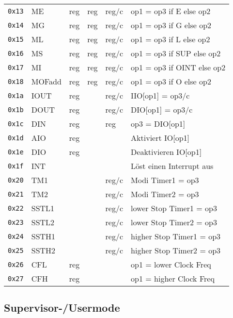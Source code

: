 \documentclass{scrartcl}
\begin{document}
\begin{center}
\begin{table*}
\begin{tabular}{l | l l l l | l}
			\texttt{0x13} & ME     & reg & reg & reg/c & op1 = op3 if E else op2 \\
			\texttt{0x14} & MG     & reg & reg & reg/c & op1 = op3 if G else op2 \\
			\texttt{0x15} & ML     & reg & reg & reg/c & op1 = op3 if L else op2 \\
			\texttt{0x16} & MS     & reg & reg & reg/c & op1 = op3 if SUP else op2 \\
			\texttt{0x17} & MI     & reg & reg & reg/c & op1 = op3 if OINT else op2 \\
			\texttt{0x18} & MOFadd & reg & reg & reg/c & op1 = op3 if O else op2 \\
			\hline
			\texttt{0x1a} & IOUT & reg &  & reg/c & IIO[op1] = op3/c \\
			\texttt{0x1b} & DOUT & reg &  & reg/c & DIO[op1] = op3/c \\
			\texttt{0x1c} & DIN  & reg &  & reg & op3 = DIO[op1] \\
			\texttt{0x1d} & AIO  & reg &  &  & Aktiviert IO[op1] \\
			\texttt{0x1e} & DIO  & reg &  &  & Deaktivieren IO[op1] \\
			\hline
			\texttt{0x1f} & INT  & & & & Löst einen Interrupt aus \\
			\texttt{0x20} & TM1  & & & reg/c & Modi Timer1 = op3 \\
			\texttt{0x21} & TM2  & & & reg/c & Modi Timer2 = op3 \\
			\texttt{0x22} & SSTL1 & & & reg/c & lower Stop Timer1 = op3 \\
			\texttt{0x23} & SSTL2 & & & reg/c & lower Stop Timer2 = op3 \\
			\texttt{0x24} & SSTH1 & & & reg/c & higher Stop Timer1 = op3 \\			
			\texttt{0x25} & SSTH2 & & & reg/c & higher Stop Timer2 = op3 \\
			\texttt{0x26} & CFL  & reg & & & op1 = lower Clock Freq \\
			\texttt{0x27} & CFH  & reg & & & op1 = higher Clock Freq \\
			
			\hline
		\end{tabular}
	\end{table*}
\end{center}


\subsection{\label{section:supervisor}Supervisor-/Usermode}
\end{document}
